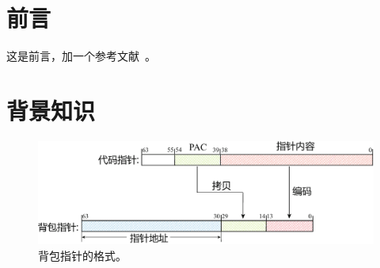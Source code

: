 \section{前言}
这是前言，加一个参考文献~\cite{ARM_MTE}。


\section{背景知识}

\begin{figure}[h]
    \centering
    \includegraphics[width=0.5\linewidth]{images/piggyback.pdf}
    \caption{背包指针的格式。}
    \label{fig:piggyback}
\end{figure}
